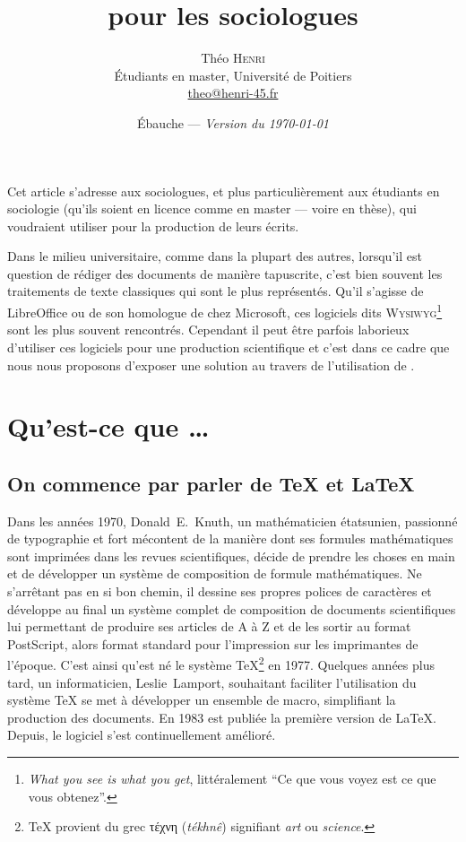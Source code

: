 \documentclass[notitlepage,onecolumn,twoside,12pt,final]{article}
\title{\sffamily \XeLaTeX pour les sociologues}
\author{Théo \textsc{Henri}\\{\small Étudiants en master, Université de Poitiers}\\{\small \url{theo@henri-45.fr}}}
\date{Ébauche --- \emph{Version du \today}}
\newcommand{\anglais}[1]{\foreignlanguage{english}{\emph{#1}}}
\begin{document}
	\maketitle

	\begin{onecolabstract}
		Cet article s'adresse aux sociologues, et plus particulièrement aux étudiants en sociologie (qu'ils soient en licence comme en master --- voire en thèse), qui voudraient utiliser \XeLaTeX pour la production de leurs écrits.
	\end{onecolabstract}
	\vspace{2em}
	
	\onehalfspacing
	
	Dans le milieu universitaire, comme dans la plupart des autres, lorsqu'il est question de rédiger des documents de manière tapuscrite, c'est bien souvent les traitements de texte classiques qui sont le plus représentés. Qu'il s'agisse de LibreOffice ou de son homologue de chez Microsoft, ces logiciels dits \textsc{Wysiwyg}\footnote{\anglais{What you see is what you get}, littéralement \enquote{Ce que vous voyez est ce que vous obtenez}.} sont les plus souvent rencontrés. Cependant il peut être parfois laborieux d'utiliser ces logiciels pour une production scientifique et c'est dans ce cadre que nous nous proposons d'exposer une solution au travers de l'utilisation de \XeLaTeX.
	
	\section{Qu'est-ce que \XeLaTeX{}…}
		\subsection{On commence par parler de \TeX{} et \LaTeX{}}
			Dans les années 1970, Donald~E.~Knuth, un mathématicien étatsunien, passionné de typographie et fort mécontent de la manière dont ses formules mathématiques sont imprimées dans les revues scientifiques, décide de prendre les choses en main et de développer un système de composition de formule mathématiques. Ne s'arrêtant pas en si bon chemin, il dessine ses propres polices de caractères et développe au final un système complet de composition de documents scientifiques lui permettant de produire ses articles de A à Z et de les sortir au format PostScript, alors format standard pour l'impression sur les imprimantes de l'époque. C'est ainsi qu'est né le système \TeX{}\footnote{\TeX{} provient du grec τέχνη (\emph{tékhnê}) signifiant \emph{art} ou \emph{science}.} en 1977. Quelques années plus tard, un informaticien, Leslie~Lamport, souhaitant faciliter l'utilisation du système \TeX{} se met à développer un ensemble de macro, simplifiant la production des documents. En 1983 est publiée la première version de \LaTeX{}. Depuis, le logiciel s'est continuellement amélioré.
		
\end{document}
